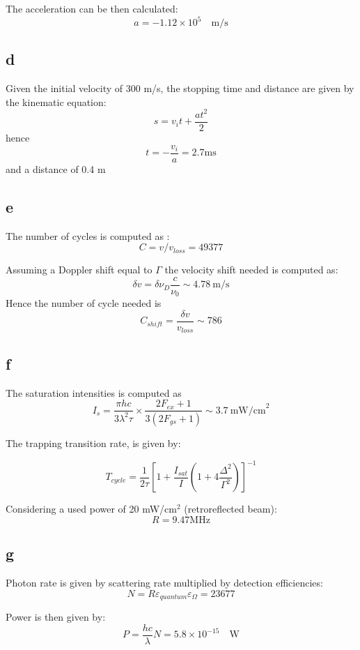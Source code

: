\documentclass[
  a4paperpaper,
]{article}
\begin{document}
The acceleration can be then calculated: \[
a = -1.12 \times 10^5 \quad \text{m/s}
\]

\hypertarget{d}{%
\subsection{d}\label{d}}

Given the initial velocity of 300 m/s, the stopping time and distance
are given by the kinematic equation: \[
s = v_i t + \dfrac{at^2}{2}
\] hence \[
t = -\dfrac{v_i}{a} = 2.7 \text{ms}
\] and a distance of 0.4 m

\hypertarget{e}{%
\subsection{e}\label{e}}

The number of cycles is computed as : \[
    C = v/v_{loss}=49377
\]

Assuming a Doppler shift equal to \(\Gamma\) the velocity shift needed
is computed as: \[
    \delta v = \delta \nu_{D} \dfrac{c}{\nu_{0}} \sim 4.78\ \text{m/s}
\] Hence the number of cycle needed is \[
    C_{shift} = \dfrac{\delta v}{v_{loss}}\sim 786 
\]

\hypertarget{f}{%
\subsection{f}\label{f}}

The saturation intensities is computed as \[
    I_{s} = \dfrac{\pi h c }{3 \lambda^2 \tau} \times \dfrac{2F_{ex}+1}{ 3(2F_{gs}+1)} \sim 3.7\ \text{mW/cm}^2
\]

The trapping transition rate, is given by:

\[
T_{cycle} = \dfrac{1}{2\tau} \left[ 1+\dfrac{I_{sat}}{I}\left( 1+4\dfrac{\Delta ^2}{\Gamma^2}\right)\right]^{-1}
\]

Considering a used power of 20 mW/cm\(^2\) (retroreflected beam): \[
R=9.47 \text{MHz}
\]

\hypertarget{g}{%
\subsection{g}\label{g}}

Photon rate is given by scattering rate multiplied by detection
efficiencies: \[
N=R \varepsilon_{quantum}\varepsilon_{\Omega} = 23677
\]

Power is then given by: \[
P=\dfrac{h c}{\lambda} N = 5.8\times10^{-15}\quad\text{W}
\]
\end{document}
